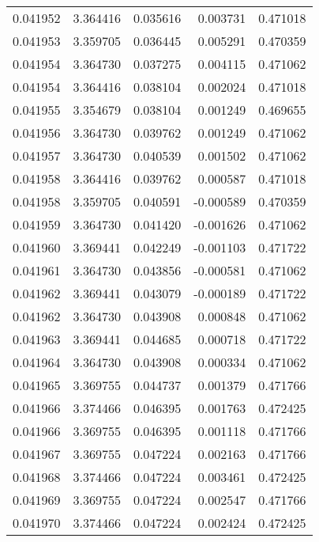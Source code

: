 \begin{tabular}{lrrrr}
0.041952    &  3.364416 &  0.035616 &  0.003731 &             0.471018 \\
0.041953    &  3.359705 &  0.036445 &  0.005291 &             0.470359 \\
0.041954    &  3.364730 &  0.037275 &  0.004115 &             0.471062 \\
0.041954    &  3.364416 &  0.038104 &  0.002024 &             0.471018 \\
0.041955    &  3.354679 &  0.038104 &  0.001249 &             0.469655 \\
0.041956    &  3.364730 &  0.039762 &  0.001249 &             0.471062 \\
0.041957    &  3.364730 &  0.040539 &  0.001502 &             0.471062 \\
0.041958    &  3.364416 &  0.039762 &  0.000587 &             0.471018 \\
0.041958    &  3.359705 &  0.040591 & -0.000589 &             0.470359 \\
0.041959    &  3.364730 &  0.041420 & -0.001626 &             0.471062 \\
0.041960    &  3.369441 &  0.042249 & -0.001103 &             0.471722 \\
0.041961    &  3.364730 &  0.043856 & -0.000581 &             0.471062 \\
0.041962    &  3.369441 &  0.043079 & -0.000189 &             0.471722 \\
0.041962    &  3.364730 &  0.043908 &  0.000848 &             0.471062 \\
0.041963    &  3.369441 &  0.044685 &  0.000718 &             0.471722 \\
0.041964    &  3.364730 &  0.043908 &  0.000334 &             0.471062 \\
0.041965    &  3.369755 &  0.044737 &  0.001379 &             0.471766 \\
0.041966    &  3.374466 &  0.046395 &  0.001763 &             0.472425 \\
0.041966    &  3.369755 &  0.046395 &  0.001118 &             0.471766 \\
0.041967    &  3.369755 &  0.047224 &  0.002163 &             0.471766 \\
0.041968    &  3.374466 &  0.047224 &  0.003461 &             0.472425 \\
0.041969    &  3.369755 &  0.047224 &  0.002547 &             0.471766 \\
0.041970    &  3.374466 &  0.047224 &  0.002424 &             0.472425 \\

\end{tabular}
